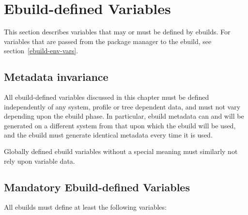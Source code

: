 \chapter{Ebuild-defined Variables}
\label{ebuild-vars}

\note This section describes variables that may or must be defined by ebuilds. For
variables that are passed from the package manager to the ebuild, see section~\ref{ebuild-env-vars}.

\section{Metadata invariance}
\label{metadata-invariance}

All ebuild-defined variables discussed in this chapter must be defined independently of
any system, profile or tree dependent data, and must not vary depending upon the ebuild
phase. In particular, ebuild metadata can and will be generated on a different system from that upon
which the ebuild will be used, and the ebuild must generate identical metadata every time it
is used.

Globally defined ebuild variables without a special meaning must similarly not rely upon
variable data.

\section{Mandatory Ebuild-defined Variables}

All ebuilds must define at least the following variables:

